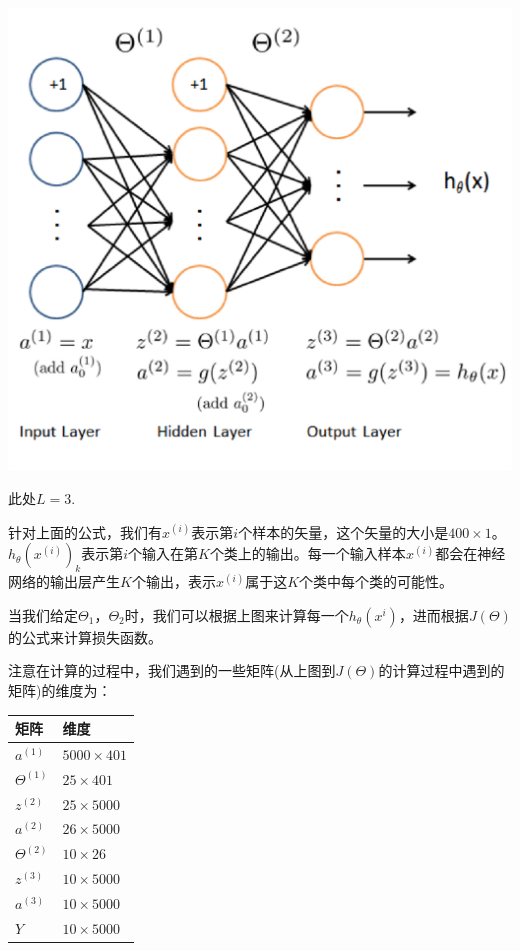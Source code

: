 \documentclass[10pt,a4paper,UTF8]{article}
\begin{document}
\begin{center}
\includegraphics[width=.9\linewidth]{../../img/computer_ng/20171014htheta.png}
\end{center}

此处\(L=3\).

针对上面的公式，我们有\(x^{(i)}\)表示第\(i\)个样本的矢量，这个矢量的大小是\(400\times 1\)。\(h_{\theta}(x^{(i)})_{k}\)表示第\(i\)个输入在第\(K\)个类上的输出。每一个输入样本\(x^{(i)}\)都会在神经网络的输出层产生\(K\)个输出，表示\(x^{(i)}\)属于这\(K\)个类中每个类的可能性。

当我们给定\(\Theta_{1}\)，\(\Theta_{2}\)时，我们可以根据上图来计算每一个\(h_{\theta}(x^{i})\)，进而根据\(J(\Theta)\)的公式来计算损失函数。

注意在计算的过程中，我们遇到的一些矩阵(从上图到\(J(\Theta)\)的计算过程中遇到的矩阵)的维度为：

\begin{center}
\begin{tabular}{ll}
矩阵 & 维度\\
\hline
\(a^{(1)}\) & \(5000\times 401\)\\
\(\Theta^{(1)}\) & \(25\times 401\)\\
\(z^{(2)}\) & \(25\times 5000\)\\
\(a^{(2)}\) & \(26\times 5000\)\\
\(\Theta^{(2)}\) & \(10\times 26\)\\
\(z^{(3)}\) & \(10\times 5000\)\\
\(a^{(3)}\) & \(10\times 5000\)\\
\(Y\) & \(10\times 5000\)\\
\end{tabular}
\end{center}
\end{document}
